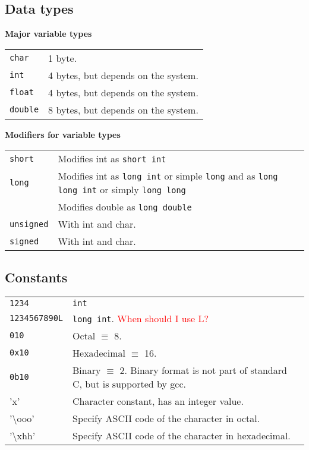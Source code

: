 \begin{multicols*}{3}
\subsection{Data types}
\textbf{Major variable types}
\begin{tabularx}{\linewidth}{lX}
\texttt{char} & 1 byte.\\
\texttt{int} & 4 bytes, but depends on the system.\\
\texttt{float} & 4 bytes, but depends on the system.\\
\texttt{double} & 8 bytes, but depends on the system.\\
\end{tabularx}

\textbf{Modifiers for variable types}
\begin{tabularx}{\linewidth}{lX}
\texttt{short} & Modifies int as \texttt{short int}\\
\texttt{long} & Modifies int as \texttt{long int} or simple \texttt{long} and as \texttt{long long int} or simply \texttt{long long}\\
&  Modifies double as \texttt{long double}\\
\texttt{unsigned} & With int and char.\\
\texttt{signed} & With int and char.\\
\end{tabularx}


\subsection{Constants}

\begin{tabularx}{\linewidth}{lX}
\texttt{1234} & \texttt{int}\\
\texttt{1234567890L} & \texttt{long int}. \textcolor{red}{When should I use L?}\\
\texttt{010} & Octal $\equiv$ 8.\\
\texttt{0x10} & Hexadecimal $\equiv$ 16.\\
\texttt{0b10} & Binary $\equiv$ 2. Binary format is not part of standard C, but is supported by gcc.\\
'x' & Character constant, has an integer value.\\
'\textbackslash ooo' & Specify ASCII code of the character in octal.\\
'\textbackslash xhh' & Specify ASCII code of the character in hexadecimal.\\
\end{tabularx}


\end{multicols*}
